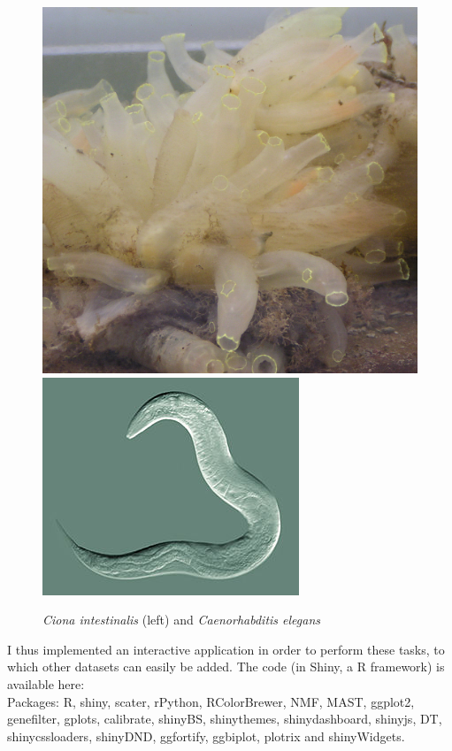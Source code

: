 \documentclass{report}
\begin{document}
{\begin{figure}[H]
\caption{\textit{Ciona intestinalis} (left) and \textit{Caenorhabditis elegans}}
\centering
\subfigure\includegraphics[scale=0.1]{illustrations/ciona.jpg}
\subfigure\includegraphics[scale=0.5]{illustrations/celegans.jpg}
\end{figure}

I thus implemented an interactive application in order to perform these tasks, to which other datasets can easily be added. The code (in Shiny, a R framework) is available here:\\  %

Packages: R\cite{baser}, shiny\cite{shinyr}, scater\cite{scaterr}, rPython\cite{rpythonr}, RColorBrewer\cite{rcolorbrewerr}, NMF\cite{nmfr}, MAST\cite{mastr}, ggplot2\cite{ggplot2r}, genefilter\cite{genefilterr}, gplots\cite{gplotsr}, calibrate\cite{calibrater}, shinyBS\cite{shinybsr}, shinythemes\cite{shinythemesr}, shinydashboard\cite{shinydashboardr}, shinyjs\cite{shinyjsr}, DT\cite{dtr}, shinycssloaders\cite{shinycssloadersr}, shinyDND\cite{shinydndr}, ggfortify\cite{ggfortifyr}, ggbiplot\cite{ggbiplotr}, plotrix\cite{plotrixr} and shinyWidgets\cite{shinywidgetsr}.\\

}
\end{document}
